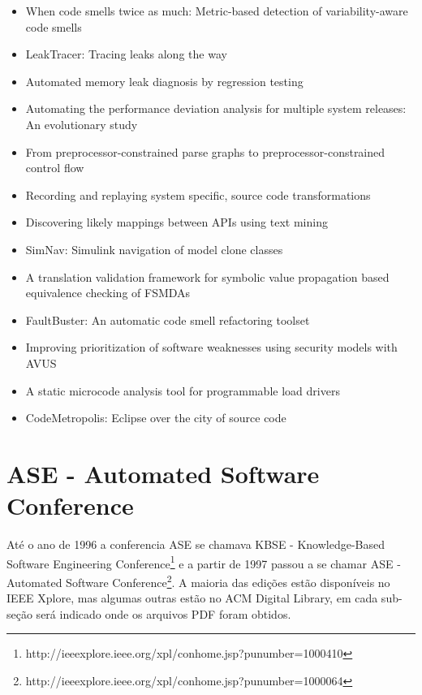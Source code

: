 {\begin{itemize}[itemsep=-1ex]
  \item When code smells twice as much: Metric-based detection of variability-aware code smells
  \item LeakTracer: Tracing leaks along the way
  \item Automated memory leak diagnosis by regression testing {\color{blue} \checkmark}{\color{red} \texttimes}
  \item Automating the performance deviation analysis for multiple system releases: An evolutionary study {\color{blue} \checkmark}{\color{red} \texttimes}
  \item From preprocessor-constrained parse graphs to preprocessor-constrained control flow
  \item Recording and replaying system specific, source code transformations
  \item Discovering likely mappings between APIs using text mining {\color{blue} \checkmark}{\color{red} \texttimes}
  \item SimNav: Simulink navigation of model clone classes
  \item A translation validation framework for symbolic value propagation based equivalence checking of FSMDAs {\color{blue} \checkmark}{\color{red} \texttimes}
  \item FaultBuster: An automatic code smell refactoring toolset {\color{blue} \checkmark}{\color{red} \texttimes}
  \item Improving prioritization of software weaknesses using security models with AVUS {\color{blue} \checkmark}{\color{red} \texttimes}
  \item A static microcode analysis tool for programmable load drivers {\color{blue} \checkmark}{\color{red} \texttimes}
  \item CodeMetropolis: Eclipse over the city of source code
\end{itemize}
}

\section{ASE - Automated Software Conference}

Até o ano de 1996 a conferencia ASE se chamava KBSE - Knowledge-Based Software
Engineering
Conference\footnote{http://ieeexplore.ieee.org/xpl/conhome.jsp?punumber=1000410}
e a partir de 1997 passou a se chamar ASE - Automated Software
Conference\footnote{http://ieeexplore.ieee.org/xpl/conhome.jsp?punumber=1000064}.
A maioria das edições estão disponíveis no IEEE Xplore, mas algumas outras
estão no ACM Digital Library, em cada sub-seção será indicado onde os arquivos
PDF foram obtidos.

